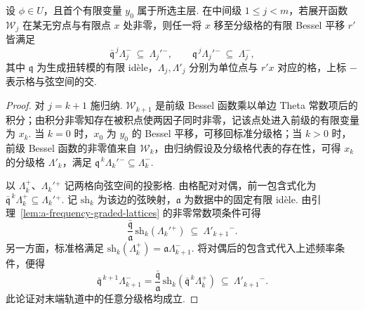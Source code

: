 \begin{lemma}[展开函数的格支集]
\label{lem:a-seesaw-lattice-support}
\emitthmsource
设 $\phi\in U$，且首个有限变量 $y_0$ 属于所选主层. 在中间级 $1\le j<m$，若展开函数 $\mathcal W_j$ 在某无穷点与有限点 $x$ 处非零，则任一将 $x$ 移至分级格的有限 Bessel 平移 $r'$ 皆满足
\[
 \bar{\mathfrak q}^{\,j}\Lambda_j^{-}\ \subseteq\ \Lambda_j'{}^{-},
 \qquad
 {\mathfrak q}^{\,j}\Lambda_j'{}^{-}\ \subseteq\ \Lambda_j^{-},
\]
其中 $\mathfrak q$ 为生成扭转模的有限 idèle，$\Lambda_j,\Lambda'_j$ 分别为单位点与 $r'x$ 对应的格，上标 $-$ 表示格与弦空间的交.
\end{lemma}
\begin{proof}
对 $j=k+1$ 施归纳. $\mathcal W_{k+1}$ 是前级 Bessel 函数乘以单边 Theta 常数项后的积分；由积分非零知存在被积点使两因子同时非零，记该点处进入前级的有限变量为 $x_k$. 当 $k=0$ 时，$x_0$ 为 $y_0$ 的 Bessel 平移，可移回标准分级格；当 $k>0$ 时，前级 Bessel 函数的非零值来自 $\mathcal W_k$，由归纳假设及分级格代表的存在性，可得 $x_k$ 的分级格 $\Lambda'_k$，满足 $\mathfrak q^{\,k}\Lambda_k'{}^{-}\subseteq\Lambda_k^{-}$.

以 $\Lambda_k^+$、$\Lambda_k'{}^+$ 记两格向弦空间的投影格. 由格配对对偶，前一包含式化为 $\bar{\mathfrak q}^{\,k}\Lambda_k^+\subseteq\Lambda_k'{}^+$. 记 $\mathrm{sh}_k$ 为该边的弦映射，$\mathfrak a$ 为数据中的固定有限 idèle. 由引理~\ref{lem:a-frequency-graded-lattices} 的非零常数项条件可得
\[
 \frac{\bar{\mathfrak q}}{\mathfrak a}\,
       \mathrm{sh}_k(\Lambda_k'{}^+)\ \subseteq\ \Lambda'_{k+1}{}^{-}.
\]
另一方面，标准格满足 $\mathrm{sh}_k(\Lambda_k^+)=\mathfrak a\Lambda_{k+1}^{-}$. 将对偶后的包含式代入上述频率条件，便得
\[
 \bar{\mathfrak q}^{\,k+1}\Lambda_{k+1}^{-}
   =\frac{\bar{\mathfrak q}}{\mathfrak a}\,
           \mathrm{sh}_k(\bar{\mathfrak q}^{\,k}\Lambda_k^+)
   \ \subseteq\ \Lambda'_{k+1}{}^{-}.
\]
此论证对末端轨道中的任意分级格均成立.


\end{proof}
